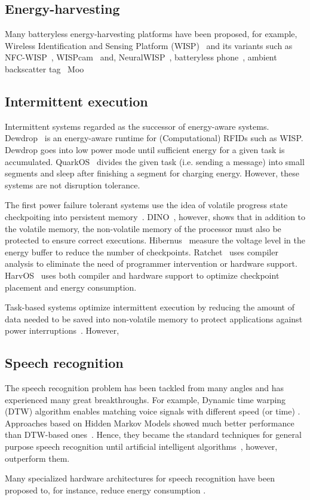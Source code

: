 \subsection{Energy-harvesting}
Many batteryless energy-harvesting platforms have been proposed, for example, Wireless Identification and Sensing Platform (WISP)~\cite{smith_ubicomp_2006} and its variants such as NFC-WISP~\cite{zhao2015nfc}, WISPcam~\cite{naderiparizi_rfid_2015} and, NeuralWISP~\cite{yeager2009neuralwisp}, batteryless phone~\cite{talla2017battery}, ambient backscatter tag~\cite{liu2013ambient} Moo~\cite{moo}

\subsection{Intermittent execution}
Intermittent systems regarded as the successor of energy-aware systems. Dewdrop~\cite{} is an energy-aware runtime for (Computational) RFIDs such as WISP. 
Dewdrop goes into low power mode until sufficient energy for a given task is accumulated. QuarkOS~\cite{} divides the given task (i.e. sending a message)  into small segments and sleep after finishing a segment for charging energy. However, these systems are not disruption tolerance.  

The first power failure tolerant systems use the idea of volatile progress state checkpoiting into persistent memory~\cite{mementos}. DINO~\cite{dino}, however, shows that in addition to the volatile memory, the non-volatile memory of the processor must also be protected to ensure correct executions. Hibernus~\cite{} measure the voltage level in the energy buffer to reduce the number of checkpoints. Ratchet~\cite{} uses compiler analysis to eliminate the need of programmer intervention or hardware support. HarvOS~\cite{} uses both compiler and hardware support to optimize checkpoint placement and energy consumption.

Task-based systems optimize intermittent execution by reducing the amount of data needed to be saved into non-volatile memory to protect applications against power interruptions~\cite{chain}. However,  



\subsection{Speech recognition}
The speech recognition problem has been tackled from many angles and has experienced many great breakthroughs. For example, Dynamic time warping (DTW) algorithm enables matching voice signals with different speed (or time) \cite{}. Approaches based on Hidden Markov Models showed much better performance than DTW-based ones~\cite{jelinek1997statistical}. Hence, they became the standard techniques for general purpose speech recognition until artificial intelligent algorithms~\cite{hinton2012deep}, however, outperform them. 

Many specialized hardware architectures for speech recognition have been proposed to, for instance, reduce energy consumption \cite{price2018low,price20156}. 
